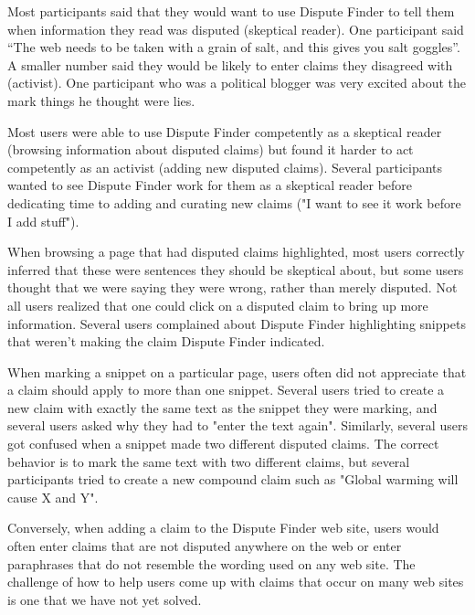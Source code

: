 \documentclass{www2010-submission}
\begin{document}
Most participants said that they would want to use Dispute Finder to tell them when information they read was disputed (skeptical reader). One participant said ``The web needs to be taken with a grain of salt, and this gives you salt goggles''. A smaller number said they would be likely to enter claims they disagreed with (activist). One participant who was a political blogger was very excited about the mark things he thought were lies.

Most users were able to use Dispute Finder competently as a skeptical reader (browsing information about disputed claims) but found it harder to act competently as an activist (adding new disputed claims). Several participants wanted to see Dispute Finder work for them as a skeptical reader before dedicating time to adding and curating new claims ("I want to see it work before I add stuff").

When browsing a page that had disputed claims highlighted, most users correctly inferred that these were sentences they should be skeptical about, but some users thought that we were saying they were wrong, rather than merely disputed. Not all users realized that one could click on a disputed claim to bring up more information. Several users complained about Dispute Finder highlighting snippets that weren't making the claim Dispute Finder indicated.

%

When marking a snippet on a particular page, users often did not appreciate that a claim should apply to more than one snippet. Several users tried to create a new claim with exactly the same text as the snippet they were marking, and several users asked why they had to "enter the text again". Similarly, several users got confused when a snippet made two different disputed claims. The correct behavior is to mark the same text with two different claims, but several participants tried to create a new compound claim such as "Global warming will cause X and Y". 

Conversely, when adding a claim to the Dispute Finder web site, users would often enter claims that are not disputed anywhere on the web or enter paraphrases that do not resemble the wording used on any web site. The challenge of how to help users come up with claims that occur on many web sites is one that we have not yet solved.
\end{document}
